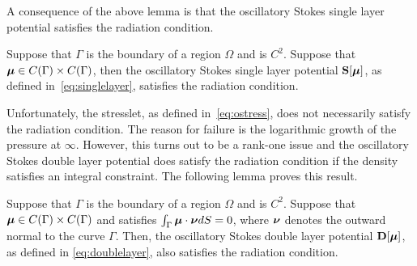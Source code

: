 A consequence of the above lemma is that the oscillatory Stokes
single layer potential satisfies the radiation condition.
\begin{cor}
Suppose that $\Gamma$ is the boundary of a region $\Omega$
and is $C^{2}$. 
Suppose that ${\boldsymbol \mu} \in C(\Gamma)\times C(\Gamma)$, then
the oscillatory Stokes single layer potential ${\bf S}[{\boldsymbol \mu}]$,
as defined in~\cref{eq:singlelayer}, satisfies the radiation condition.
\end{cor}
Unfortunately, the stresslet, as defined in~\cref{eq:ostress}, 
does not necessarily satisfy the radiation condition.
The reason for failure is the logarithmic growth of 
the pressure at $\infty$.
However, this turns out to be a rank-one issue and 
the oscillatory Stokes double layer potential
does satisfy the radiation condition 
if the density satisfies an integral constraint.
The following lemma proves this result.

\begin{lem}
Suppose that $\Gamma$ is the boundary of a region $\Omega$
and is $C^{2}$. 
Suppose that ${\boldsymbol \mu} \in C(\Gamma) \times C(\Gamma)$ and satisfies
$\int_{\Gamma} {\boldsymbol \mu} \cdot {\boldsymbol \nu} dS = 0$, where
${\boldsymbol \nu}$ denotes the outward normal to the curve $\Gamma$.
Then, the oscillatory Stokes 
double layer potential ${\bf D}[{\boldsymbol \mu}]$, as defined in \eqref{eq:doublelayer},
also satisfies the radiation condition.
\end{lem}

